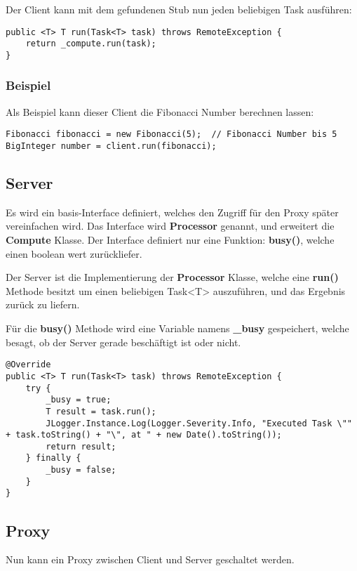 Der Client kann mit dem gefundenen Stub nun jeden beliebigen Task ausführen:

\begin{lstlisting}[style=Java, caption=Client Implementation - Task run]
public <T> T run(Task<T> task) throws RemoteException {
    return _compute.run(task);
}
\end{lstlisting}

\subsubsection{Beispiel}

Als Beispiel kann dieser Client die Fibonacci Number berechnen lassen:

\begin{lstlisting}[style=Java, caption=Client Implementation - Fibonacci Beispiel]
Fibonacci fibonacci = new Fibonacci(5);  // Fibonacci Number bis 5
BigInteger number = client.run(fibonacci);
\end{lstlisting}

\subsection{Server}
Es wird ein basis-Interface definiert, welches den Zugriff für den Proxy später vereinfachen wird. Das Interface wird \textbf{Processor} genannt, und erweitert die \textbf{Compute} Klasse. 
Der Interface definiert nur eine Funktion: \textbf{busy()}, welche einen boolean wert zurückliefer.

Der Server ist die Implementierung der \textbf{Processor} Klasse, welche eine \textbf{run()} Methode besitzt um einen beliebigen Task<T> auszuführen, und das Ergebnis zurück zu liefern.

Für die \textbf{busy()} Methode wird eine Variable namens \textbf{_busy} gespeichert, welche besagt, ob der Server gerade beschäftigt ist oder nicht.

\begin{lstlisting}[style=Java, caption=Server Implementation - run Methode]
@Override
public <T> T run(Task<T> task) throws RemoteException {
	try {
    	_busy = true;
        T result = task.run();
        JLogger.Instance.Log(Logger.Severity.Info, "Executed Task \"" + task.toString() + "\", at " + new Date().toString());
		return result;
    } finally {
    	_busy = false;
    }
}
\end{lstlisting}


\subsection{Proxy}
Nun kann ein Proxy zwischen Client und Server geschaltet werden.

